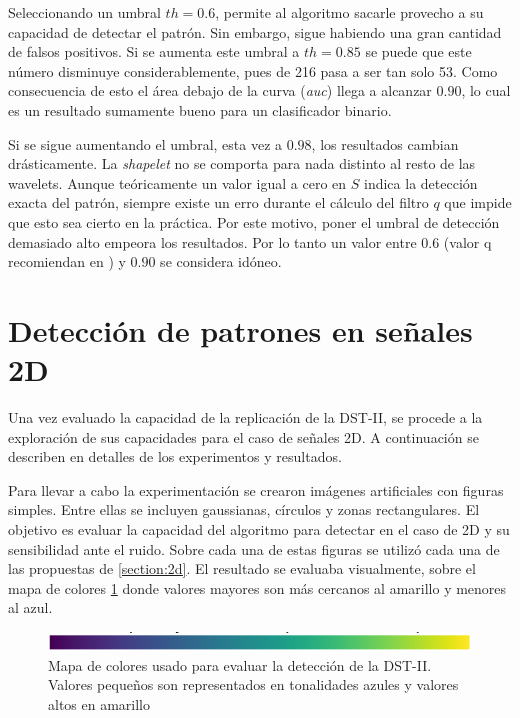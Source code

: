 Seleccionando un umbral $th=0.6$, permite al algoritmo sacarle provecho a su capacidad de detectar el patrón. Sin embargo,
sigue habiendo una gran cantidad de falsos positivos. Si se aumenta este umbral a $th=0.85$ se puede que este número
disminuye considerablemente, pues de 216 pasa a ser tan solo 53. Como consecuencia de esto el área debajo de la curva
(\textit{auc}) llega a alcanzar $0.90$, lo cual es un resultado sumamente bueno para un clasificador binario.

Si se sigue aumentando el umbral, esta vez a $0.98$, los resultados cambian drásticamente. La \textit{shapelet} no
se comporta para nada distinto al resto de las wavelets. Aunque teóricamente un valor igual a cero en $S$ indica
la detección exacta del patrón, siempre existe un erro durante el cálculo del filtro $q$ que impide que esto sea
cierto en la práctica. Por este motivo, poner el umbral de detección demasiado alto empeora los resultados.
Por lo tanto un valor entre $0.6$ (valor q recomiendan en \cite{Guido2018}) y $0.90$ se considera idóneo.

\section{Detección de patrones en señales 2D}

Una vez evaluado la capacidad de la replicación de la DST-II, se procede a la exploración de sus capacidades 
para el caso de señales 2D. A continuación se describen en detalles de los experimentos y resultados.

Para llevar a cabo la experimentación se crearon imágenes artificiales con figuras simples. Entre ellas se incluyen gaussianas,
círculos y zonas rectangulares. El objetivo es evaluar la capacidad del algoritmo para detectar en el caso de 2D
y su sensibilidad ante el ruido. Sobre cada una de estas figuras se utilizó cada una de las propuestas de \ref{section:2d}.
El resultado se evaluaba visualmente, sobre el  mapa de colores \ref{fig:colormap} donde valores mayores son más cercanos
al amarillo y menores al azul.

\begin{figure}
	\centering
	\includegraphics[scale=0.8]{Graphics/colormap.png} 
	\caption{Mapa de colores usado para evaluar la detección de la DST-II. Valores pequeños son representados en tonalidades azules y valores altos en amarillo} \label{fig:colormap}
\end{figure}

